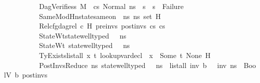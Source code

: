 \begin{isabellebody}
\ \ \ \ \ \ \ \ \ \ DagVerifies{\isacharcolon}{\kern0pt}{\isachardoublequoteopen}{\isasymAnd}s{}{\isacharprime}{\kern0pt}{\isachardot}{\kern0pt}\ M{\isacharcomma}{\kern0pt}{\isasymLambda}{\isacharcomma}{\kern0pt}{\isasymGamma}{\isacharcomma}{\kern0pt}{\isasymOmega}\ {\isasymturnstile}\ {\isasymlangle}cs{}{\isacharcomma}{\kern0pt}\ Normal\ ns{}{\isasymrangle}\ {\isacharbrackleft}{\kern0pt}{\isasymrightarrow}{\isacharbrackright}{\kern0pt}\ s{}{\isacharprime}{\kern0pt}\ {\isasymLongrightarrow}\ s{}{\isacharprime}{\kern0pt}\ {\isasymnoteq}\ Failure{\isachardoublequoteclose}\ \isanewline
\ \ \ \ \ \ \ \ \ \ SameModH{\isacharcolon}{\kern0pt}{\isachardoublequoteopen}nstate{\isacharunderscore}{\kern0pt}same{\isacharunderscore}{\kern0pt}on\ {\isasymLambda}\ ns{}\ ns{}\ {\isacharparenleft}{\kern0pt}set\ H{\isacharparenright}{\kern0pt}{\isachardoublequoteclose}\ \isanewline
\ \ \ \ \ \ \ \ \ \ Rel{\isacharcolon}{\kern0pt}{\isachardoublequoteopen}cfg{\isacharunderscore}{\kern0pt}dag{\isacharunderscore}{\kern0pt}rel\ c\ H\ pre{\isacharunderscore}{\kern0pt}invs\ post{\isacharunderscore}{\kern0pt}invs\ cs{}\ cs{}{\isachardoublequoteclose}\ \isanewline
\ \ \ \ \ \ \ \ \ \ StateWt{\isacharcolon}{\kern0pt}{\isachardoublequoteopen}state{\isacharunderscore}{\kern0pt}well{\isacharunderscore}{\kern0pt}typed\ {\isasymLambda}\ {\isasymOmega}\ ns{}{\isachardoublequoteclose}\ \isanewline
\ \ \ \ \ \ \ \ \ \ StateWt{}{\isacharcolon}{\kern0pt}\ {\isachardoublequoteopen}state{\isacharunderscore}{\kern0pt}well{\isacharunderscore}{\kern0pt}typed\ {\isasymLambda}\ {\isasymOmega}\ ns{}{\isachardoublequoteclose}\ \isanewline
\ \ \ \ \ \ \ \ \ \ TyExists{\isacharcolon}{\kern0pt}{\isachardoublequoteopen}list{\isacharunderscore}{\kern0pt}all\ {\isacharparenleft}{\kern0pt}{\isasymlambda}x{\isachardot}{\kern0pt}\ {\isasymexists}t{\isachardot}{\kern0pt}\ lookup{\isacharunderscore}{\kern0pt}var{\isacharunderscore}{\kern0pt}decl\ {\isasymLambda}\ x\ {\isacharequal}{\kern0pt}\ Some\ {\isacharparenleft}{\kern0pt}t{\isacharcomma}{\kern0pt}\ None{\isacharparenright}{\kern0pt}{\isacharparenright}{\kern0pt}\ H{\isachardoublequoteclose}\ \isanewline
\ \ \ \ \ \ \ \ \ \ PostInvsReduce{\isacharcolon}{\kern0pt}\ {\isachardoublequoteopen}{\isasymAnd}ns{\isachardot}{\kern0pt}\ state{\isacharunderscore}{\kern0pt}well{\isacharunderscore}{\kern0pt}typed\ {\isasymLambda}\ {\isasymOmega}\ ns\ {\isasymLongrightarrow}\ list{\isacharunderscore}{\kern0pt}all\ {\isacharparenleft}{\kern0pt}{\isasymlambda}inv{\isachardot}{\kern0pt}\ {\isasymexists}b{\isachardot}{\kern0pt}\ {\isasymLambda}{\isacharcomma}{\kern0pt}{\isasymGamma}{\isacharcomma}{\kern0pt}{\isasymOmega}\ {\isasymturnstile}\ {\isasymlangle}inv{\isacharcomma}{\kern0pt}\ ns{\isasymrangle}\ {\isasymDown}\ BoolV\ b{\isacharparenright}{\kern0pt}\ post{\isacharunderscore}{\kern0pt}invs{\isachardoublequoteclose}\isanewline

\end{isabellebody}
